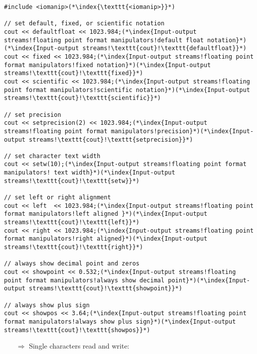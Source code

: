 \documentclass[10pt]{article}
\begin{document}
\begin{lstlisting}
#include <iomanip>(*\index{\texttt{<iomanip>}}*)

// set default, fixed, or scientific notation
cout << defaultfloat << 1023.984;(*\index{Input-output streams!floating point format manipulators!default float notation}*)(*\index{Input-output streams!\texttt{cout}!\texttt{defaultfloat}}*)
cout << fixed << 1023.984;(*\index{Input-output streams!floating point format manipulators!fixed notation}*)(*\index{Input-output streams!\texttt{cout}!\texttt{fixed}}*)
cout << scientific << 1023.984;(*\index{Input-output streams!floating point format manipulators!scientific notation}*)(*\index{Input-output streams!\texttt{cout}!\texttt{scientific}}*)

// set precision
cout << setprecision(2) << 1023.984;(*\index{Input-output streams!floating point format manipulators!precision}*)(*\index{Input-output streams!\texttt{cout}!\texttt{setprecision}}*)

// set character text width
cout << setw(10);(*\index{Input-output streams!floating point format manipulators! text width}*)(*\index{Input-output streams!\texttt{cout}!\texttt{setw}}*)

// set left or right alignment
cout << left  << 1023.984;(*\index{Input-output streams!floating point format manipulators!left aligned }*)(*\index{Input-output streams!\texttt{cout}!\texttt{left}}*)
cout << right << 1023.984;(*\index{Input-output streams!floating point format manipulators!right aligned}*)(*\index{Input-output streams!\texttt{cout}!\texttt{right}}*)

// always show decimal point and zeros
cout << showpoint << 0.532;(*\index{Input-output streams!floating point format manipulators!always show decimal point}*)(*\index{Input-output streams!\texttt{cout}!\texttt{showpoint}}*)

// always show plus sign
cout << showpos << 3.64;(*\index{Input-output streams!floating point format manipulators!always show plus sign}*)(*\index{Input-output streams!\texttt{cout}!\texttt{showpos}}*)
\end{lstlisting}
\begin{enumerate}
\item[$\Rightarrow$] Single characters read and write:
\end{enumerate}
\end{document}
